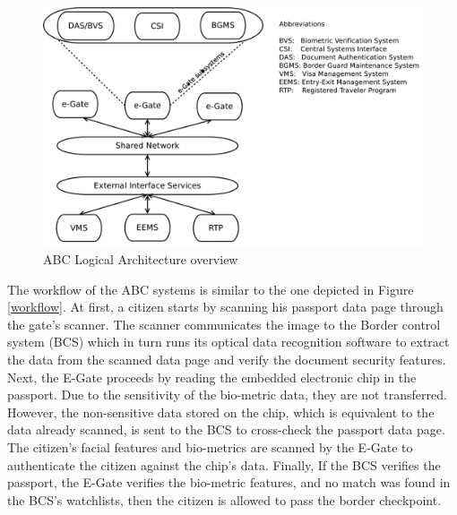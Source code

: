 \begin{figure}[H]
	\centering
	\includegraphics[scale=0.35]{Images/E-Gate-Architecture.png}
	\caption{ABC Logical Architecture overview \cite{labati2016biometric}}
	\label{E-Gate-Architecture}
\end{figure}

\par
The workflow of the ABC systems is similar to the one depicted in Figure \ref{workflow}. At first, a citizen starts by scanning his passport data page through the gate's scanner. The scanner communicates the image to the Border control system (BCS) which in turn runs its optical data recognition software to extract the data from the scanned data page and verify the document security features. Next, the E-Gate proceeds by reading the embedded electronic chip in the passport. Due to the sensitivity of the bio-metric data, they are not transferred. However, the non-sensitive data stored on the chip, which is equivalent to the data already scanned, is sent to the BCS to cross-check the passport data page. The citizen's facial features and bio-metrics are scanned by the E-Gate to authenticate the citizen against the chip's data. Finally, If the BCS verifies the passport, the E-Gate verifies the bio-metric features, and no match was found in the BCS's watchlists, then the citizen is allowed to pass the border checkpoint.

